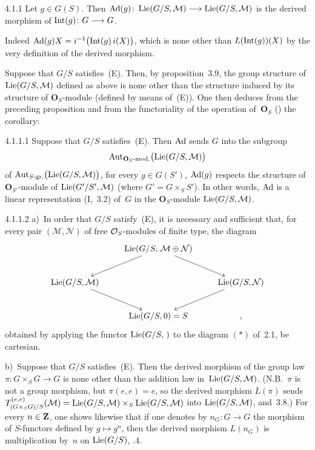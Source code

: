 \begin{proposition}{4.1.1}\label{II.4.1.1}
Let \(g\in G(S)\). Then
\(\operatorname{Ad}(g)\colon\operatorname{Lie}(G/S,\mathcal{M})\longrightarrow\operatorname{Lie}(G/S,\mathcal{M})\)
is the derived morphism of \(\operatorname{Int}(g)\colon G\longrightarrow G\).
\end{proposition}

Indeed \(\operatorname{Ad}(g)X=i^{-1}\bigl(\operatorname{Int}(g)\,i(X)\bigr)\), which is none other than
\(L(\operatorname{Int}(g))(X)\) by the very definition of the derived morphism.

Suppose that \(G/S\) satisfies~(E). Then, by proposition~3.9, the group
structure of \(\operatorname{Lie}(G/S,\mathcal{M})\) defined as above is none other than
the structure induced by its structure of \(\mathbf{O}_{S}\)-module (defined
by means of~(E)). One then deduces from the preceding proposition and from
the functoriality of the operation of~\(\mathbf{O}_{S}\) () the
corollary:

\begin{corollary}{4.1.1.1}\label{II.4.1.1.1}
Suppose that \(G/S\) satisfies~(E). Then \(\operatorname{Ad}\) sends \(G\) into the subgroup
\[
\operatorname{Aut}_{\mathbf{O}_{S}\text{-mod.}}\bigl(\operatorname{Lie}(G/S,\mathcal{M})\bigr)
\]
of \(\operatorname{Aut}_{S\text{-gr.}}\bigl(\operatorname{Lie}(G/S,\mathcal{M})\bigr)\), \ie for every
\(g\in G(S')\), \(\operatorname{Ad}(g)\) respects the structure of
\(\mathbf{O}_{S'}\)-module of \(\operatorname{Lie}(G'/S',\mathcal{M})\) (where
\(G'=G\times_{S}S'\)). In other words, \(\operatorname{Ad}\) is a linear representation
(\cf I,~3.2) of~\(G\) in the \(\mathbf{O}_{S}\)-module
\(\operatorname{Lie}(G/S,\mathcal{M})\).
\end{corollary}

\begin{remarks}{4.1.1.2}\label{II.4.1.1.2}
a)~In order that \(G/S\) satisfy~(E), it is necessary and sufficient that,
for every pair \((\mathcal{M},\mathcal{N})\) of free \(\mathcal{O}_S\)-modules of finite
type, the diagram
\[
\xymatrix{
& \Lie(G/S,\,\mathcal{M}\oplus\mathcal{N}) \ar[dl] \ar[dr] & \\
\Lie(G/S,\mathcal{M}) \ar[dr]
  && \Lie(G/S,\mathcal{N}) \ar[dl] \\
& \Lie(G/S,0)=S &,
}
\]
obtained by applying the functor \(\operatorname{Lie}(G/S,\,)\) to the diagram \((*)\)
of~2.1, be cartesian.

b)~Suppose that \(G/S\) satisfies~(E). Then the derived morphism of the group
law \(\pi\colon G\times_{S}G\to G\) is none other than the addition law
in~\(\operatorname{Lie}(G/S,\mathcal{M})\). (N.B.\ \(\pi\) is not a group morphism, but
\(\pi(e,e)=e\), so the derived morphism \(L(\pi)\) sends
\(T^{(e,e)}_{(G\times_{S}G)/S}(\mathcal{M})
  =\operatorname{Lie}(G/S,\mathcal{M})\times_{S}\operatorname{Lie}(G/S,\mathcal{M})\)
into \(\operatorname{Lie}(G/S,\mathcal{M})\),  and~3.8.)
For every \(n\in\mathbf{Z}\), one shows likewise that if one denotes by
\(n_{G}\colon G\to G\) the morphism of \(S\)-functors defined by
\(g\mapsto g^{n}\), then the derived morphism \(L(n_{G})\) is multiplication
by~\(n\) on \(\operatorname{Lie}(G/S)\), .4.
\end{remarks}

